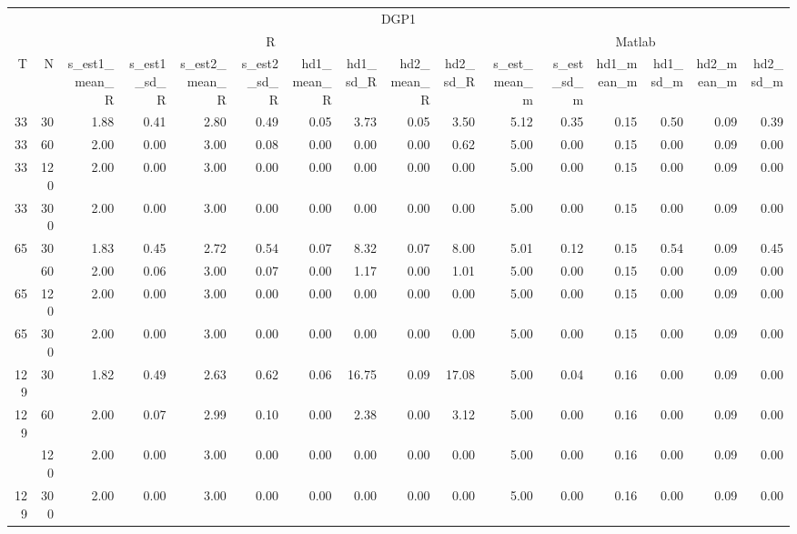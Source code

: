 
\begin{tabular}{rrrrrrrrrrrrrrrr}
\toprule
\multicolumn{16}{c}{DGP1} \\
\cmidrule(l{3pt}r{3pt}){1-16}
\multicolumn{2}{c}{ } & \multicolumn{8}{c}{R} & \multicolumn{6}{c}{Matlab} \\
\cmidrule(l{3pt}r{3pt}){3-10} \cmidrule(l{3pt}r{3pt}){11-16}
T & N & s\_est1\_mean\_R & s\_est1\_sd\_R & s\_est2\_mean\_R & s\_est2\_sd\_R & hd1\_mean\_R & hd1\_sd\_R & hd2\_mean\_R & hd2\_sd\_R & s\_est\_mean\_m & s\_est\_sd\_m & hd1\_mean\_m & hd1\_sd\_m & hd2\_mean\_m & hd2\_sd\_m\\
\midrule
33 & 30 & 1.88 & 0.41 & 2.80 & 0.49 & 0.05 & 3.73 & 0.05 & 3.50 & 5.12 & 0.35 & 0.15 & 0.50 & 0.09 & 0.39\\
33 & 60 & 2.00 & 0.00 & 3.00 & 0.08 & 0.00 & 0.00 & 0.00 & 0.62 & 5.00 & 0.00 & 0.15 & 0.00 & 0.09 & 0.00\\
33 & 120 & 2.00 & 0.00 & 3.00 & 0.00 & 0.00 & 0.00 & 0.00 & 0.00 & 5.00 & 0.00 & 0.15 & 0.00 & 0.09 & 0.00\\
33 & 300 & 2.00 & 0.00 & 3.00 & 0.00 & 0.00 & 0.00 & 0.00 & 0.00 & 5.00 & 0.00 & 0.15 & 0.00 & 0.09 & 0.00\\
65 & 30 & 1.83 & 0.45 & 2.72 & 0.54 & 0.07 & 8.32 & 0.07 & 8.00 & 5.01 & 0.12 & 0.15 & 0.54 & 0.09 & 0.45\\
\addlinespace
65 & 60 & 2.00 & 0.06 & 3.00 & 0.07 & 0.00 & 1.17 & 0.00 & 1.01 & 5.00 & 0.00 & 0.15 & 0.00 & 0.09 & 0.00\\
65 & 120 & 2.00 & 0.00 & 3.00 & 0.00 & 0.00 & 0.00 & 0.00 & 0.00 & 5.00 & 0.00 & 0.15 & 0.00 & 0.09 & 0.00\\
65 & 300 & 2.00 & 0.00 & 3.00 & 0.00 & 0.00 & 0.00 & 0.00 & 0.00 & 5.00 & 0.00 & 0.15 & 0.00 & 0.09 & 0.00\\
129 & 30 & 1.82 & 0.49 & 2.63 & 0.62 & 0.06 & 16.75 & 0.09 & 17.08 & 5.00 & 0.04 & 0.16 & 0.00 & 0.09 & 0.00\\
129 & 60 & 2.00 & 0.07 & 2.99 & 0.10 & 0.00 & 2.38 & 0.00 & 3.12 & 5.00 & 0.00 & 0.16 & 0.00 & 0.09 & 0.00\\
\addlinespace
129 & 120 & 2.00 & 0.00 & 3.00 & 0.00 & 0.00 & 0.00 & 0.00 & 0.00 & 5.00 & 0.00 & 0.16 & 0.00 & 0.09 & 0.00\\
129 & 300 & 2.00 & 0.00 & 3.00 & 0.00 & 0.00 & 0.00 & 0.00 & 0.00 & 5.00 & 0.00 & 0.16 & 0.00 & 0.09 & 0.00\\
\bottomrule
\end{tabular}
